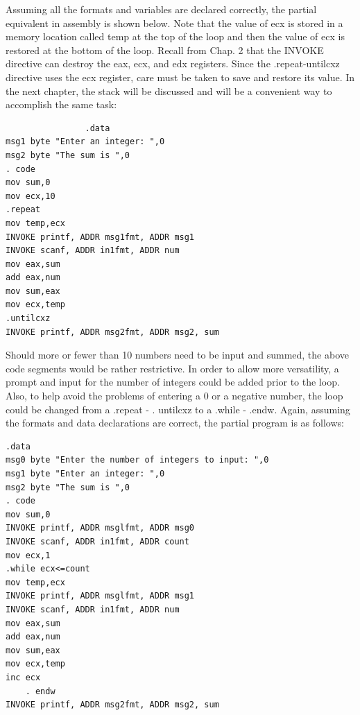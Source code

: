 \documentclass[10pt]{book}
\begin{document}
Assuming all the formats and variables are declared correctly, the partial equivalent in assembly is shown below. Note that the value of ecx is stored in a memory location called temp at the top of the loop and then the value of ecx is restored at the bottom of the loop. Recall from Chap. 2 that the INVOKE directive can destroy the eax, ecx, and edx registers. Since the .repeat-untilcxz directive uses the ecx register, care must be taken to save and restore its value. In the next chapter, the stack will be discussed and will be a convenient way to accomplish the same task:

\begin{verbatim}
                .data
msg1 byte "Enter an integer: ",0
msg2 byte "The sum is ",0
. code
mov sum,0
mov ecx,10
.repeat
mov temp,ecx
INVOKE printf, ADDR msg1fmt, ADDR msg1
INVOKE scanf, ADDR in1fmt, ADDR num
mov eax,sum
add eax,num
mov sum,eax
mov ecx,temp
.untilcxz
INVOKE printf, ADDR msg2fmt, ADDR msg2, sum
\end{verbatim}

Should more or fewer than 10 numbers need to be input and summed, the above code segments would be rather restrictive. In order to allow more versatility, a prompt and input for the number of integers could be added prior to the loop. Also, to help avoid the problems of entering a 0 or a negative number, the loop could be changed from a .repeat - . untilcxz to a .while - .endw. Again, assuming the formats and data declarations are correct, the partial program is as follows:

\begin{verbatim}
.data
msg0 byte "Enter the number of integers to input: ",0
msg1 byte "Enter an integer: ",0
msg2 byte "The sum is ",0
. code
mov sum,0
INVOKE printf, ADDR msglfmt, ADDR msg0
INVOKE scanf, ADDR in1fmt, ADDR count
mov ecx,1
.while ecx<=count
mov temp,ecx
INVOKE printf, ADDR msglfmt, ADDR msg1
INVOKE scanf, ADDR in1fmt, ADDR num
mov eax,sum
add eax,num
mov sum,eax
mov ecx,temp
inc ecx
    . endw
INVOKE printf, ADDR msg2fmt, ADDR msg2, sum
\end{verbatim}
\end{document}
